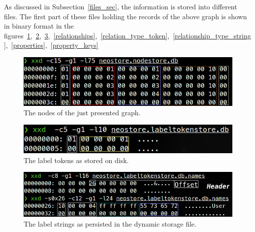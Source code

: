 \documentclass[a4paper,10pt]{article}
\begin{document}
    As discussed in Subsection~\ref{files_sec}, the information is stored into different files. 
    The first part of these files holding the records of the above graph is shown in binary format in the figures~\ref{nodes},~\ref{label_tokens},~\ref{label_strings},~\ref{relationships},~\ref{relation_type_token},~\ref{relationship_type_string},~\ref{properties},~\ref{property_keys}
    \begin{figure}[htp]\label{nodes}
        \begin{center}
            \includegraphics[keepaspectratio,height=1.2\textheight,width=1.2\textwidth]{img/04_example/nodes.png}
        \end{center}
        \caption{The nodes of the just presented graph.} %
    \end{figure}
    \begin{figure}[htp]\label{label_tokens}
        \begin{center}
            \includegraphics[keepaspectratio,height=1.2\textheight,width=1.2\textwidth]{img/04_example/label_token.png}
        \end{center}
        \caption{The label tokens as stored on disk.} %
    \end{figure}
    \begin{figure}[htp]\label{label_strings}
        \begin{center}
            \includegraphics[keepaspectratio,height=1.2\textheight,width=1.2\textwidth]{img/04_example/labels_string_dynamic.png}
        \end{center}
        \caption{The label strings as persisted in the dynamic storage file.} %
    \end{figure}
\end{document}

